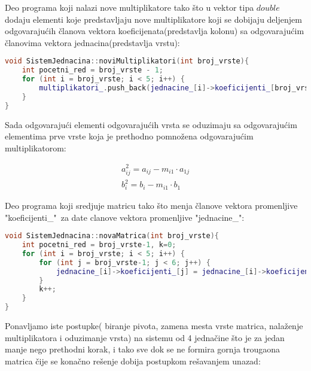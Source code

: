 \documentclass[12pt,leqno,a4paper]{article}
\begin{document}
Deo programa koji nalazi nove multiplikatore tako \v sto u vektor tipa $double$ dodaju elementi koje predstavljaju nove multiplikatore koji se dobijaju deljenjem odgovaraju\' cih \v clanova vektora koeficijenata(predstavlja kolonu) sa odgovaraju\' cim \v clanovima vektora jedna\cv cina(predstavlja vrstu):

\begin{lstlisting}[language=C++ ]
void SistemJednacina::noviMultiplikatori(int broj_vrste){
	int pocetni_red = broj_vrste - 1;
	for (int i = broj_vrste; i < 5; i++) {
		multiplikatori_.push_back(jednacine_[i]->koeficijenti_[broj_vrste-1]/ jednacine_[pocetni_red]->koeficijenti_[broj_vrste-1]);
	}
}
\end{lstlisting}

Sada odgovaraju\' ci elementi odgovaraju\' cih vrsta se oduzimaju sa odgovaraju\' cim elementima prve vrste koja je prethodno pomno\v zena odgovaraju\' cim multiplikatorom:

\begin{equation*}
  \begin{aligned}
    a_{ij}^{2}=a_{ij}-m_{i1} \cdot a_{1j} \\
    b_{i}^{2}=b_{i}-m_{i1} \cdot b_{1}
 \end{aligned}
\end{equation*}

Deo programa koji sredjuje matricu tako \v sto menja \v clanove vektora promenljive "koeficijenti\_"\  za date clanove vektora promenljive "jednacine\_":

\begin{lstlisting}[language=C++ ]
void SistemJednacina::novaMatrica(int broj_vrste){
	int pocetni_red = broj_vrste-1, k=0;
	for (int i = broj_vrste; i < 5; i++) {
		for (int j = broj_vrste-1; j < 6; j++) {
			jednacine_[i]->koeficijenti_[j] = jednacine_[i]->koeficijenti_[j] - multiplikatori_[k] * jednacine_[pocetni_red]->koeficijenti_[j];
		}
		k++;
	}
}
\end{lstlisting}


Ponavljamo iste postupke( biranje pivota, zamena mesta vrste matrica, nala\v zenje multiplikatora i oduzimanje vrsta) na sistemu od 4 jedna\v cine \v sto je za jedan manje nego prethodni korak, i tako sve dok se ne formira gornja
trougaona matrica \v cije se kona\v cno re\v senje dobija postupkom re\v savanjem unazad:
\end{document}
